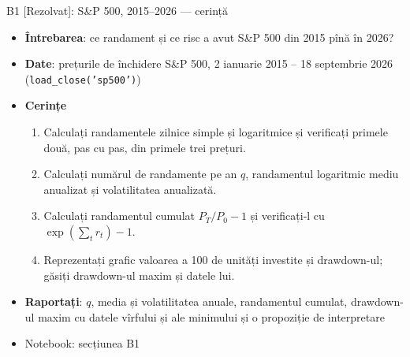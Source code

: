 \begin{frame}{B1 [Rezolvat]: S\&P 500, 2015--2026 --- cerință}
\itemsize{\footnotesize}
\begin{itemize}
\item \textbf{Întrebarea}: ce randament și ce risc a avut S\&P 500 din 2015 pînă în 2026?
\item \textbf{Date}: prețurile de închidere S\&P 500, 2 ianuarie 2015 -- 18 septembrie 2026 (\texttt{load\_close('sp500')})
\item \textbf{Cerințe}
\begin{enumerate}
    \item Calculați randamentele zilnice simple și logaritmice și verificați primele două, pas cu pas, din primele trei prețuri.
    \item Calculați numărul de randamente pe an $q$, randamentul logaritmic mediu anualizat și volatilitatea anualizată.
    \item Calculați randamentul cumulat $P_T/P_0 - 1$ și verificați-l cu $\exp(\sum_t r_t) - 1$.
    \item Reprezentați grafic valoarea a 100 de unități investite și drawdown-ul; găsiți drawdown-ul maxim și datele lui.
\end{enumerate}
\item \textbf{Raportați}: $q$, media și volatilitatea anuale, randamentul cumulat, drawdown-ul maxim cu datele vîrfului și ale minimului și o propoziție de interpretare
\item Notebook: secțiunea B1
\end{itemize}
\end{frame}

